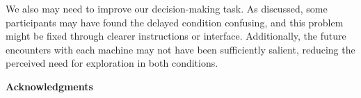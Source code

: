 \documentclass[10pt,letterpaper]{article}
\begin{document}
We also may need to improve our decision-making task. As discussed, some
participants may have found the delayed condition confusing, and this problem
might be fixed through clearer instructions or interface. Additionally, the
future encounters with each machine may not have been sufficiently salient,
reducing the perceived need for exploration in both conditions.


\begin{small}
  \noindent
\textbf{Acknowledgments} 
\end{small}



\end{document}
